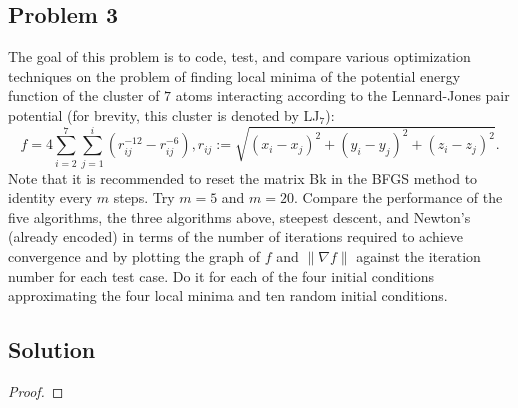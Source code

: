 \documentclass[12pt]{report}
\begin{document}

\begin{problem}%
\subsection*{Problem 3}

The goal of this problem is to code, test, and compare various optimization
techniques on the problem of finding local minima of the potential energy function
of the cluster of $7$ atoms interacting according to the Lennard-Jones pair potential (for brevity, this cluster is denoted by LJ$_7$):
\[
     f = 4 \sum_{i=2}^7\sum_{j=1}^i(r_{ij}^{-12}-r_{ij}^{-6}), r_{ij} := \sqrt{(x_i - x_j)^2 +(y_i - y_j)^2 + (z_i - z_j)^2}.
\]
Note that it is recommended to reset the matrix Bk in the BFGS method to identity every $m$ steps. Try $m = 5$ and $m = 20$. Compare the performance of the five algorithms, the three algorithms above, steepest descent, and Newton's (already encoded) in terms of the number of iterations required to achieve convergence and by plotting the graph of $f$ and $\|\nabla f\|$ against the iteration number for each test case. Do it for each of the four initial conditions approximating the four local minima and ten random initial conditions.

\subsection*{Solution}
\begin{proof}
    



\end{proof}
\end{problem}
\end{document}
